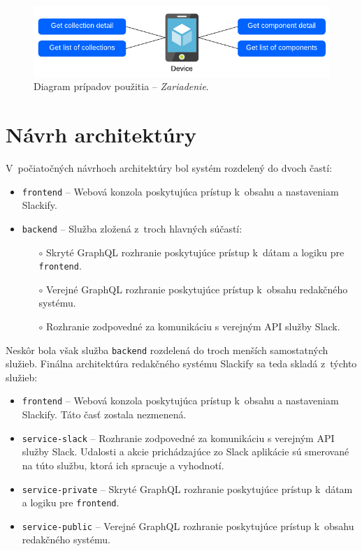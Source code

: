 \begin{figure}[H]
	\centering
	\includegraphics[scale=0.9]{obrazky-figures/device_use_case}
	\caption{Diagram prípadov použitia -- \emph{Zariadenie}.}
\end{figure}

\section{Návrh architektúry}
\label{design:architecture}
V~počiatočných návrhoch architektúry bol systém rozdelený do dvoch častí:

\begin{itemize}
	\item \texttt{frontend} -- Webová konzola poskytujúca prístup k~obsahu a nastaveniam Slackify.
	\item \texttt{backend} -- Služba zložená z~troch hlavných súčastí:
		\begin{itemize}
			\item[$\circ$] Skryté GraphQL rozhranie poskytujúce prístup k~dátam a logiku pre \texttt{frontend}.
			\item[$\circ$] Verejné GraphQL rozhranie poskytujúce prístup k~obsahu redakčného systému.
			\item[$\circ$] Rozhranie zodpovedné za komunikáciu s verejným API služby Slack.
		\end{itemize}
\end{itemize}

\noindent Neskôr bola však služba \texttt{backend} rozdelená do troch menších samostatných služieb. Finálna architektúra redakčného systému Slackify sa teda skladá z~týchto služieb:

\begin{itemize}
	\item \texttt{frontend} -- Webová konzola poskytujúca prístup k~obsahu a nastaveniam Slackify. Táto časť zostala nezmenená.
	\item \texttt{service-slack} -- Rozhranie zodpovedné za komunikáciu s verejným API služby Slack. Udalosti a akcie prichádzajúce zo Slack aplikácie sú smerované na túto službu, ktorá ich spracuje a vyhodnotí.
	\item \texttt{service-private} -- Skryté GraphQL rozhranie poskytujúce prístup k~dátam a logiku pre \texttt{frontend}.
	\item \texttt{service-public} -- Verejné GraphQL rozhranie poskytujúce prístup k~obsahu redakčného systému.
\end{itemize}

